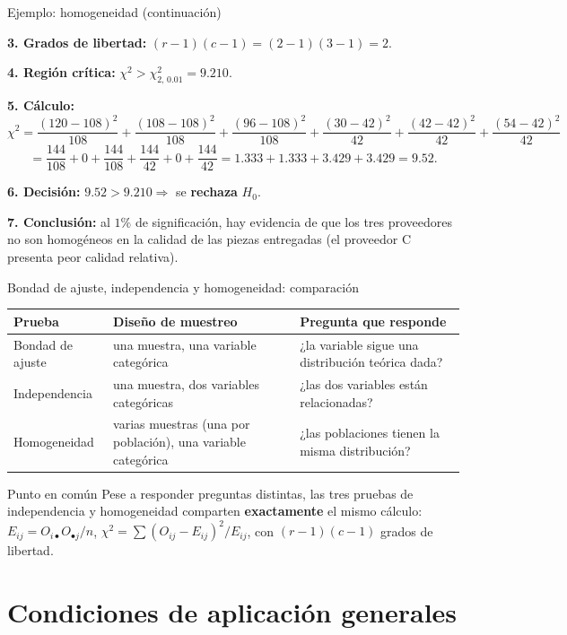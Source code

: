 \documentclass[aspectratio=169,11pt]{beamer}
\begin{document}
\begin{frame}{Ejemplo: homogeneidad (continuación)}
\begin{example}
\textbf{3. Grados de libertad:} $(r-1)(c-1)=(2-1)(3-1)=2$.

\textbf{4. Región crítica:} $\chi^2>\chi^2_{2,\,0.01}=9.210$.

\textbf{5. Cálculo:}
\[
\chi^2=\frac{(120-108)^2}{108}+\frac{(108-108)^2}{108}+\frac{(96-108)^2}{108}+\frac{(30-42)^2}{42}+\frac{(42-42)^2}{42}+\frac{(54-42)^2}{42}
\]
\[
=\frac{144}{108}+0+\frac{144}{108}+\frac{144}{42}+0+\frac{144}{42}=1.333+1.333+3.429+3.429=9.52.
\]

\textbf{6. Decisión:} $9.52>9.210\Rightarrow$ se \textbf{rechaza} $H_0$.

\textbf{7. Conclusión:} al $1\%$ de significación, hay evidencia de que los tres proveedores no son homogéneos en la calidad de las piezas entregadas (el proveedor C presenta peor calidad relativa).
\end{example}
\end{frame}

\begin{frame}{Bondad de ajuste, independencia y homogeneidad: comparación}
\begin{table}[]
\centering
\scriptsize
\begin{tabular}{@{}p{2.3cm}p{3.4cm}p{3.5cm}@{}}
\toprule
Prueba & Diseño de muestreo & Pregunta que responde \\
\midrule
Bondad de ajuste & una muestra, una variable categórica & ¿la variable sigue una distribución teórica dada? \\[0.6em]
Independencia & una muestra, dos variables categóricas & ¿las dos variables están relacionadas? \\[0.6em]
Homogeneidad & varias muestras (una por población), una variable categórica & ¿las poblaciones tienen la misma distribución? \\
\bottomrule
\end{tabular}
\end{table}
\begin{alertblock}{Punto en común}
Pese a responder preguntas distintas, las tres pruebas de independencia y homogeneidad comparten \textbf{exactamente} el mismo cálculo: $E_{ij}=O_{i\bullet}O_{\bullet j}/n$, $\chi^2=\sum(O_{ij}-E_{ij})^2/E_{ij}$, con $(r-1)(c-1)$ grados de libertad.
\end{alertblock}
\end{frame}

\section{Condiciones de aplicación generales}
\end{document}
